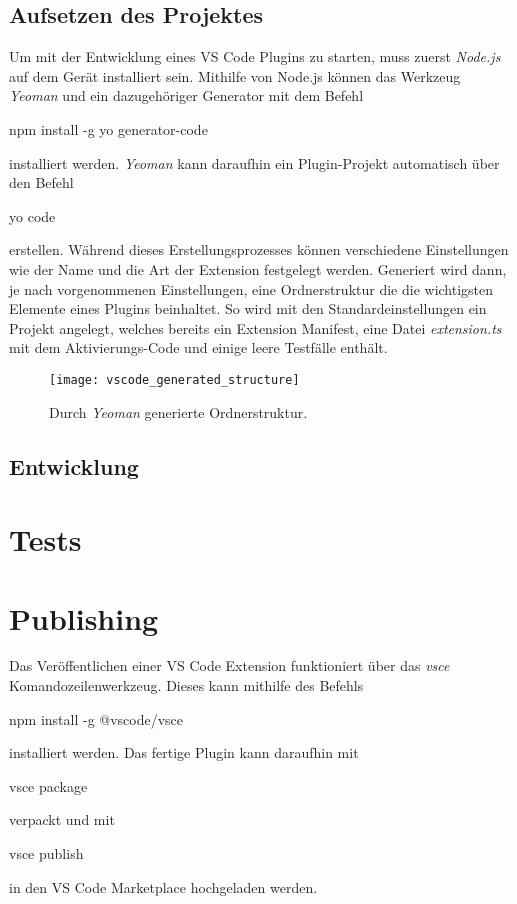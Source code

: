\subsection{Aufsetzen des Projektes}

Um mit der Entwicklung eines VS Code Plugins zu starten, muss zuerst \emph{Node.js} %
auf dem Gerät installiert sein. Mithilfe von Node.js können das Werkzeug
\emph{Yeoman} und ein dazugehöriger Generator mit dem Befehl
\begin{GenericCode}[numbers=none]
    npm install -g yo generator-code
\end{GenericCode}
installiert werden.
\emph{Yeoman} kann daraufhin ein Plugin-Projekt automatisch über den Befehl
\begin{GenericCode}[numbers=none]
    yo code
\end{GenericCode}
erstellen. Während dieses Erstellungsprozesses können verschiedene Einstellungen
wie der Name und die Art der Extension festgelegt werden. Generiert wird dann,
je nach vorgenommenen Einstellungen, eine Ordnerstruktur die die wichtigsten
Elemente eines Plugins beinhaltet. So wird mit den Standardeinstellungen
ein Projekt angelegt, welches bereits ein Extension Manifest, eine Datei 
\emph{extension.ts} mit dem Aktivierungs-Code und einige leere Testfälle enthält.

\begin{figure}
    \centering
    \texttt{[image: vscode\_generated\_structure]}
    \caption{Durch \emph{Yeoman} generierte Ordnerstruktur.}
    \label{fig:vscode_generated_structure}
\end{figure}   

\subsection{Entwicklung}

\section{Tests}
\label{sec:EntwicklungVsCode_Tests}

\section{Publishing}
\label{sec:EntwicklungVsCode_Publishing}

Das Veröffentlichen einer VS Code Extension funktioniert über das 
\emph{vsce} Komandozeilenwerkzeug. Dieses kann mithilfe des Befehls
\begin{GenericCode}[numbers=none]
    npm install -g @vscode/vsce
\end{GenericCode}
installiert werden. Das fertige Plugin kann daraufhin mit 
\begin{GenericCode}[numbers=none]
    vsce package
\end{GenericCode}
verpackt und mit 
\begin{GenericCode}[numbers=none]
    vsce publish
\end{GenericCode}
in den VS Code Marketplace hochgeladen werden.

